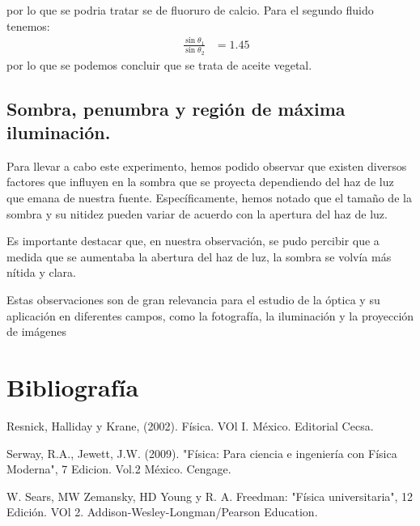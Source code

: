 \documentclass[10pt,journal]{IEEEtran}
\begin{document}
por lo que  se podria tratar se de fluoruro de calcio. Para el segundo fluido tenemos:
\begin{align*}
\quad \frac{\sin\theta_1}{\sin\theta_2} &= 1.45
\end{align*}
por lo que se podemos concluir que se trata de aceite vegetal.
\item 


\subsection{Sombra, penumbra y región de máxima iluminación.}
Para llevar a cabo este experimento, hemos podido observar que existen diversos factores que influyen en la sombra que se proyecta dependiendo del haz de luz que emana de nuestra fuente. Específicamente, hemos notado que el tamaño de la sombra y su nitidez pueden variar de acuerdo con la apertura del haz de luz.

Es importante destacar que, en nuestra observación, se pudo percibir que a medida que se aumentaba la abertura del haz de luz, la sombra se volvía más nítida y clara. 

Estas observaciones son de gran relevancia para el estudio de la óptica y su aplicación en diferentes campos, como la fotografía, la iluminación y la proyección de imágenes
\item 






\section{Bibliografía}


Resnick, Halliday y Krane, (2002). Física. VOl I. México. Editorial Cecsa.


Serway, R.A., Jewett, J.W. (2009). "Física: Para ciencia e ingeniería con Física Moderna", 7 Edicion. Vol.2 México. Cengage.


W. Sears, MW Zemansky, HD Young y R. A. Freedman: "Física universitaria", 12 Edición. VOl 2. Addison-Wesley-Longman/Pearson Education.
\end{document}
